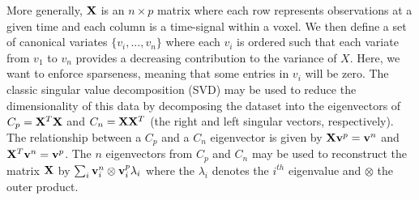 \documentclass{llncs}
\newcommand{\X}{{\bf X}}
\newcommand{\vv}{{\bf v}}
\begin{document}
 
More generally, $\X$ is an $n \times p$ matrix where each row represents observations at a given time and each column is a time-signal within a voxel. We then define a set of canonical variates $\{ v_i,...,v_n\}$ where each $v_i$ is ordered such that each variate from $v_1$ to $v_n$ provides a decreasing contribution to the variance of $X$. Here, we want to enforce sparseness, meaning that some entries in $v_i$ will be zero. The classic singular value decomposition (SVD) may be used to reduce the dimensionality of this data by decomposing the dataset into the eigenvectors of $C_p = \X^T\X$ and $C_n = \X\X^T$ (the right and left singular vectors, respectively).  The relationship between a $C_p$ and a $C_n$ eigenvector is given by $\X \vv^p = \vv^n$ and $\X^T \vv^n = \vv^p$.  The $n$ eigenvectors from $C_p$ and $C_n$ may be used to reconstruct the matrix $\X$ by $\sum_i \vv^n_i \otimes \vv^p_i \lambda_i $ where the $\lambda_i$ denotes the $i^{th}$ eigenvalue and $\otimes$ the outer product.

 
\end{document}
